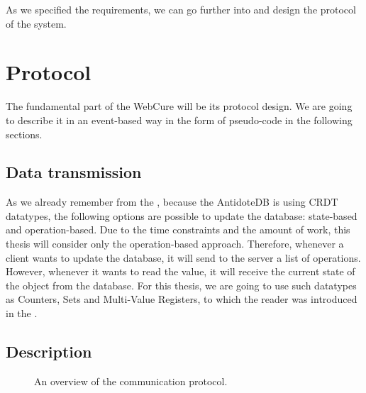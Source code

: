 As we specified the requirements, we can go further into and design the protocol of the system.

\section{Protocol}
\label{4-protocol}

The fundamental part of the WebCure will be its protocol design. We are going to describe it in an event-based way in the form of pseudo-code in the following sections. 


\subsection{Data transmission}

As we already remember from the , because the AntidoteDB is using CRDT datatypes, the following options are possible to update the database: state-based and operation-based. Due to the time constraints and the amount of work, this thesis will consider only the operation-based approach. Therefore, whenever a client wants to update the database, it will send to the server a list of operations. However, whenever it wants to read the value, it will receive the current state of the object from the database. For this thesis, we are going to use such datatypes as Counters, Sets and Multi-Value Registers, to which the reader was introduced in the .

\subsection{Description} 

\begin{figure}[!htb]
    \begin{center}
    \def\svgwidth{0.6\linewidth}
    
    \caption {An overview of the communication protocol.}
    \label{fig:protocol1}
\end{center}
\end{figure}

